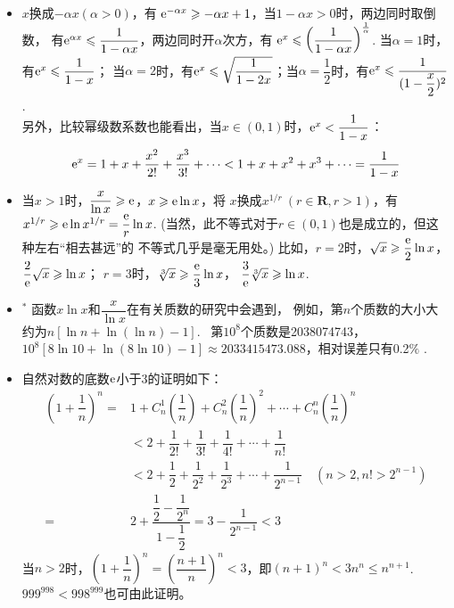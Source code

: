 \begin{itemize}[leftmargin=\inteval{\myitemleftmargin}pt,itemsep=
   \inteval{\myitemitempsep}pt,topsep=\inteval{\myitemtopsep}pt]
\item $ x $换成$ -\alpha x (\alpha>0)$，有
$ \mathrm{e}^{-\alpha x}\geqslant -\alpha x+1 $，当$ 1-\alpha x>0 $时，两边同时取倒数，
有$ \mathrm{e}^{\alpha x}\leqslant \dfrac{1}{1-\alpha x} $，两边同时开$ \alpha $次方，有
$ \mathrm{e}^x \leqslant \left(\dfrac{1}{1-\alpha x} \right)^{\frac{1}{\alpha}} $. 
当$ \alpha=1 $时，有$ \mathrm{e}^x \leqslant \dfrac{1}{1-x} $；
当$ \alpha=2 $时，有$ \mathrm{e}^x \leqslant \sqrt{\dfrac{1}{1-2x}} $；当$ \alpha=\dfrac{1}{2} $时，有$ \mathrm{e}^x \leqslant \dfrac{1}{(1-\dfrac{x}{2})^2} $. \\
另外，比较幂级数系数也能看出，当$ x \in (0, 1) $时，$ \mathrm{e}^x < \dfrac{1}{1-x} $：
\begin{align*}
    \mathrm{e}^x=1+x+\dfrac{x^2}{2!}+\dfrac{x^3}{3!}+\cdots < 1+x+x^2+x^3+\cdots =\dfrac{1}{1-x}
\end{align*}

\item 当$ x>1 $时，$ \dfrac{x}{\ln x}\geqslant \mathrm{e} $，$ x\geqslant \mathrm{e}\ln x $，将
$ x $换成$ x^{1/r}\ (r\in \textbf{R},r>1) $，有
$ x^{1/r}\geqslant \mathrm{e}\ln x^{1/r}=\dfrac{\mathrm{e}}{r}\ln x $.
(当然，此不等式对于$ r\in(0,1) $也是成立的，但这种左右“相去甚远”的
不等式几乎是毫无用处。)
比如，$ r=2 $时，$ \sqrt{x}\geqslant \dfrac{\mathrm{e}}{2}\ln x $，
$ \dfrac{2}{\mathrm{e}}\sqrt{x}\geqslant \ln x $；
$ r=3 $时，$ \sqrt[3]{x}\geqslant \dfrac{\mathrm{e}}{3}\ln x $，
$ \dfrac{3}{\mathrm{e}}\sqrt[3]{x}\geqslant \ln x $.

\item $^*$ 函数$ x\ln x $和$ \dfrac{x}{\ln x} $在有关质数的研究中会遇到，
例如，第$ n $个质数的大小大约为$ n[\ln n+\ln(\ln n)-1] $.
\ 第$ 10^8 $个质数是2038074743，
$ 10^8[8\ln 10+\ln(8\ln 10)-1]\approx 2033415473.088 $，相对误差只有0.2$ \% $ .

\item 自然对数的底数$ \mathrm{e} $小于3的证明如下：
\begin{align}
    \left( 1+\dfrac{1}{n}\right)^n =&1+C_n^1\left(\dfrac{1}{n}\right)+
    C_n^2\left(\dfrac{1}{n}\right)^2+\cdots +C_n^n\left(\dfrac{1}{n}\right)^n \nonumber \\
    &<2+\dfrac{1}{2!}+\dfrac{1}{3!}+\dfrac{1}{4!}+\cdots +\dfrac{1}{n!} \nonumber\\
    &<2+\dfrac{1}{2}+\dfrac{1}{2^2}+\dfrac{1}{2^3}+\cdots +\dfrac{1}{2^{n-1}} \quad (n>2,n!>2^{n-1}) \nonumber \\
    =&2+\dfrac{\dfrac{1}{2}-\dfrac{1}{2^n}}{1-\dfrac{1}{2}}=3-\dfrac{1}{2^{n-1}}<3 \label{e小于3的证明}
\end{align}
当$ n>2 $时，$ \left( 1+\dfrac{1}{n}\right)^n =\left(\dfrac{n+1}{n} \right)^n <3  $，即$ 
(n+1)^n<3n^n\leq n^{n+1} $.\ $ 999^{998} < 998^{999} $也可由此证明。


\end{itemize}

